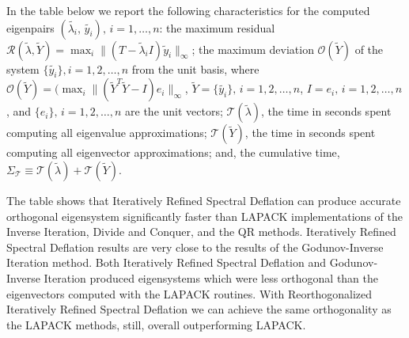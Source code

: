 \documentclass{report}
\begin{document}
In the table below we report the following characteristics for
the computed eigenpairs
$(\tilde{\lambda_i},\,\tilde{y_i}),\,i=1,\ldots, n$: the maximum
residual $\mathcal{R}(\tilde{\lambda}, \tilde{Y}) = \max_i \| (T
- \tilde{\lambda}_i I) \tilde{y}_i \|_\infty$; the maximum
deviation $\mathcal{O}(\tilde{Y})$ of the system
$\{\tilde{y_i}\}, i = 1, 2, \ldots, n$ from the unit basis, where
$\mathcal{O}(\tilde{Y})=(\max_i \|(\tilde{Y}^T \tilde{Y} - I)
e_i\|_\infty$, $\tilde{Y} = \{\tilde{y_i}\},\, i = 1, 2, \ldots,
n$, $I = {e_i},\, i = 1, 2, \ldots, n$, and $\{e_i\},\, i = 1, 2,
\ldots, n$ are the unit vectors; $\mathcal{T}( \tilde{\lambda})$,
the time in seconds spent computing all eigenvalue
approximations; $\mathcal{T}( \tilde{Y})$, the time in seconds
spent computing all eigenvector approximations; and, the
cumulative time, $\Sigma_{\mathcal{T}} \equiv
\mathcal{T}(\tilde{\lambda}) + \mathcal{T}( \tilde{Y})$.



\begin{table}[hbtp]
\centering
{}
\label{tbl:TestNew}
\end{table}

The table shows that Iteratively Refined Spectral Deflation can produce
accurate orthogonal eigensystem significantly faster than LAPACK
implementations of the Inverse Iteration, Divide and Conquer, and
the QR methods. Iteratively Refined Spectral Deflation results are very
close to the results of the Godunov-Inverse Iteration
method. Both Iteratively Refined Spectral Deflation and Godunov-Inverse
Iteration produced eigensystems which were less orthogonal than
the eigenvectors computed with the LAPACK routines. With
Reorthogonalized Iteratively Refined Spectral Deflation we can achieve the
same orthogonality as the LAPACK methods, still, overall
outperforming LAPACK.
\end{document}
